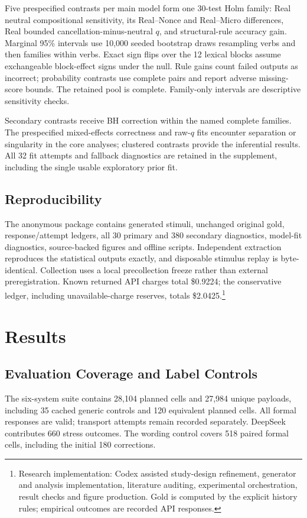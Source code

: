 \documentclass[sigconf,anonymous,review]{acmart}
\begin{document}
Five prespecified contrasts per main model form one 30-test Holm family: Real neutral compositional sensitivity, its Real--Nonce and Real--Micro differences, Real bounded cancellation-minus-neutral $q$, and structural-rule accuracy gain. Marginal 95\% intervals use 10,000 seeded bootstrap draws resampling verbs and then families within verbs. Exact sign flips over the 12 lexical blocks assume exchangeable block-effect signs under the null. Rule gains count failed outputs as incorrect; probability contrasts use complete pairs and report adverse missing-score bounds. The retained pool is complete. Family-only intervals are descriptive sensitivity checks.

Secondary contrasts receive BH correction within the named complete families. The prespecified mixed-effects correctness and raw-$q$ fits encounter separation or singularity in the core analyses; clustered contrasts provide the inferential results. All 32 fit attempts and fallback diagnostics are retained in the supplement, including the single usable exploratory prior fit.

\subsection{Reproducibility}
The anonymous package contains generated stimuli, unchanged original gold, response/attempt ledgers, all 30 primary and 380 secondary diagnostics, model-fit diagnostics, source-backed figures and offline scripts. Independent extraction reproduces the statistical outputs exactly, and disposable stimulus replay is byte-identical. Collection uses a local precollection freeze rather than external preregistration. Known returned API charges total \$0.9224; the conservative ledger, including unavailable-charge reserves, totals \$2.0425.\footnote{Research implementation: Codex assisted study-design refinement, generator and analysis implementation, literature auditing, experimental orchestration, result checks and figure production. Gold is computed by the explicit history rules; empirical outcomes are recorded API responses.}

\section{Results}
\subsection{Evaluation Coverage and Label Controls}
The six-system suite contains 28,104 planned cells and 27,984 unique payloads, including 35 cached generic controls and 120 equivalent planned cells. All formal responses are valid; transport attempts remain recorded separately. DeepSeek contributes 660 stress outcomes. The wording control covers 518 paired formal cells, including the initial 180 corrections.
\end{document}

